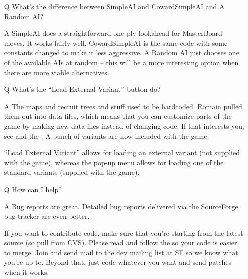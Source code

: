 \documentclass{article}
\begin{document}
\begin{itemize}
\item[Q] What's the difference between SimpleAI and CowardSimpleAI and A Random AI?

\item[A] SimpleAI does a straightforward one-ply lookahead for MasterBoard
 moves. It works fairly well.  CowardSimpleAI is the same code with some
 constants changed to make it less aggressive.  A Random AI just chooses one of the available AIs at random -- this will be a more interesting option when there are more viable alternatives.


\item[Q] What's the ``Load External Variant'' button do? 

\item[A] The maps and recruit trees and stuff used to be hardcoded. Romain
 pulled them out into data files, which means that you can customize parts 
 of the game by making new data files instead of changing code. If that 
 interests you, see
 and the
 .
 A bunch of variants are now included with the game.

 ``Load External Variant'' allows for loading an external variant
 (not supplied with the game), whereas the pop-up menu allows
 for loading one of the standard variants (supplied with the game).

\item[Q] How can I help?

\item[A] Bug reports are great. Detailed bug reports delivered via the 
 SourceForge bug tracker are even better. 
 
 If you want to contribute code, make sure that you're starting 
 from the latest source (so pull from CVS). Please read and follow
 the 
 so your code is easier to merge. Join and send mail to the dev mailing
 list at SF so we know what you're up to. Beyond that, just code whatever
 you want and send patches when it works.

\end{itemize}
\end{document}
